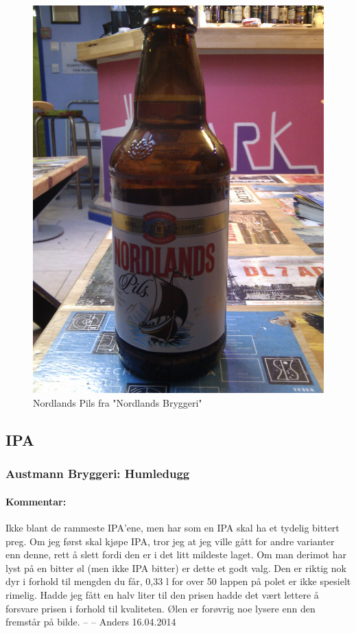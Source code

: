 \documentclass[12pt,a4paper,oneside,norsk]{article}
\begin{document}
\begin{figure} [H]
\centering
\includegraphics[scale=0.1, angle=0]{Bilder/Ol/NordlandsPils.jpg}
\caption{Nordlands Pils fra "Nordlands Bryggeri"}
\end{figure}

\newpage
\subsection{IPA}
\subsubsection{Austmann Bryggeri: Humledugg}
\paragraph{Kommentar:} Ikke blant de rammeste IPA'ene, men har som en IPA skal ha et tydelig bittert preg. Om jeg først skal kjøpe IPA, tror jeg at jeg ville gått for andre varianter enn denne, rett å slett fordi den er i det litt mildeste laget. Om man derimot har lyst på en bitter øl (men ikke IPA bitter) er dette et godt valg. Den er riktig nok dyr i forhold til mengden du får, 0,33 l for over 50 lappen på polet er ikke spesielt rimelig. Hadde jeg fått en halv liter til den prisen hadde det vært lettere å forsvare prisen i forhold til kvaliteten. Ølen er forøvrig noe lysere enn den fremstår på bilde.
\newline
-- -- Anders 16.04.2014
\end{document}
